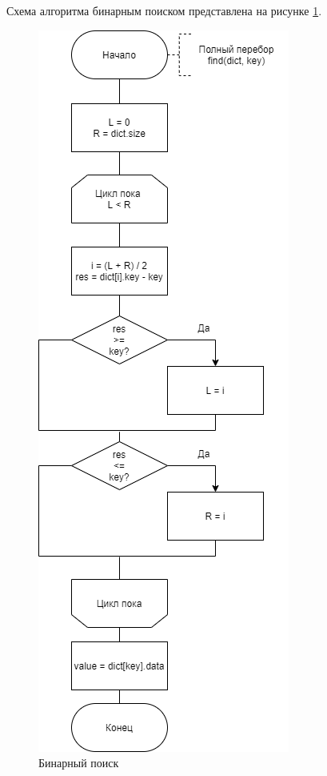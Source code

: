 \documentclass[a4paper,oneside,14pt]{extreport}
\begin{document}
Схема алгоритма бинарным поиском представлена на рисунке \ref{fig:binary}.
\begin{figure}[H]
	\centering
	\includegraphics[scale = 0.55]{images/bin_search.png}
	\caption{Бинарный поиск}
	\label{fig:binary}
\end{figure}
\end{document}

